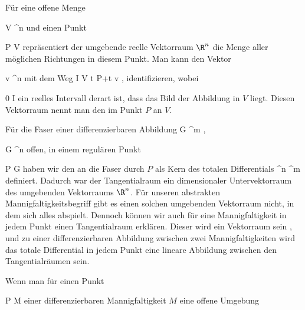 \setcounter{section}{9}


Für eine offene Menge

\mavergleichskette
{\vergleichskette
{V
}
{ \subseteq }{ \R^n
}
{  }{
}
{    }{
}
{   }{
}
}
{}{}{}
und einen Punkt

\mavergleichskette
{\vergleichskette
{P
}
{ \in }{V
}
{  }{
}
{    }{
}
{   }{
}
}
{}{}{}
repräsentiert der umgebende reelle Vektorraum $\R^n$ die Menge aller möglichen Richtungen in diesem Punkt. Man kann den Vektor

\mavergleichskette
{\vergleichskette
{v
}
{ \in }{ \R^n
}
{  }{
}
{    }{
}
{   }{
}
}
{}{}{}
mit dem Weg
\maabbeledisp {} {I} {V
} {t} { P+t v
} {,}
identifizieren, wobei

\mavergleichskette
{\vergleichskette
{ 0
}
{ \in }{ I
}
{  }{
}
{    }{
}
{   }{
}
}
{}{}{}
ein reelles Intervall derart ist, dass das Bild der Abbildung in $V$ liegt. Diesen Vektorraum nennt man den  {} im Punkt $P$ an $V$.

Für die Faser einer differenzierbaren Abbildung
\maabb {\varphi} {G} {\R^m
} {,}

\mavergleichskette
{\vergleichskette
{G
}
{ \subseteq }{ \R^n
}
{  }{
}
{    }{
}
{   }{
}
}
{}{}{}
offen, in einem regulären Punkt

\mavergleichskette
{\vergleichskette
{P
}
{ \in }{G
}
{  }{
}
{    }{
}
{   }{
}
}
{}{}{}
haben wir den
an die Faser durch $P$ als Kern des totalen Differentials
 {\R^n } { \R^m
} {}
definiert. Dadurch war der Tangentialraum ein
dimensionaler Untervektorraum des umgebenden Vektorraums $\R^n$. Für unseren abstrakten Mannigfaltigkeitsbegriff gibt es einen solchen umgebenden Vektorraum nicht, in dem sich alles abspielt. Dennoch können wir auch für eine Mannigfaltigkeit in jedem Punkt einen Tangentialraum erklären. Dieser wird ein Vektorraum sein
 {} {,}
und zu einer differenzierbaren Abbildung zwischen zwei Mannigfaltigkeiten wird das totale Differential in jedem Punkt eine lineare Abbildung zwischen den Tangentialräumen sein.

Wenn man für einen Punkt

\mavergleichskette
{\vergleichskette
{P
}
{ \in }{M
}
{  }{
}
{    }{
}
{   }{
}
}
{}{}{}
einer differenzierbaren Mannigfaltigkeit $M$ eine offene Umgebung

